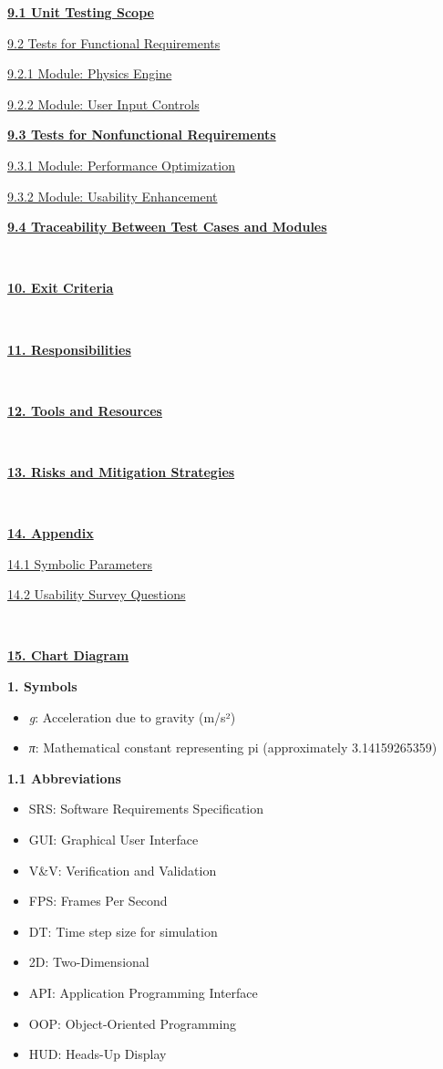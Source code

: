 \documentclass[
]{article}
\begin{document}
\protect\hyperlink{Ayy}{\textbf{9.1 Unit Testing Scope}}

\protect\hyperlink{Ao2}{9.2 Tests for Functional Requirements}

\protect\hyperlink{Ao3}{9.2.1 Module: Physics Engine}

\protect\hyperlink{Ao4}{9.2.2 Module: User Input Controls}

\protect\hyperlink{Ao5}{\textbf{9.3 Tests for Nonfunctional
Requirements}}

\protect\hyperlink{Ao6}{9.3.1 Module: Performance Optimization}

\protect\hyperlink{Ao7}{9.3.2 Module: Usability Enhancement}

\protect\hyperlink{Ao8}{\textbf{9.4 Traceability Between Test Cases and
Modules}}

\

\protect\hyperlink{Akol}{\textbf{10. Exit Criteria}}

\

\protect\hyperlink{Ahhhh}{\textbf{11. Responsibilities}}

\

\protect\hyperlink{Accc}{\textbf{12. Tools and Resources}}

\

\protect\hyperlink{Aggg}{\textbf{13. Risks and Mitigation Strategies}}

\

\textbf{\protect\hyperlink{Al}{14. Appendix}}

\protect\hyperlink{All}{14.1 Symbolic Parameters}

\protect\hyperlink{Allll}{14.2 Usability Survey Questions}

\

\protect\hyperlink{Ajj}{\textbf{15. Chart Diagram}}

\textbf{\hfill\break
}

\newpage
\protect\hypertarget{Adsds}{}{}\textbf{1. Symbols}


\begin{itemize}
\item
  \emph{g}: Acceleration due to gravity (m/s²)
\item
  \emph{π}: Mathematical constant representing pi (approximately
  3.14159265359)
\end{itemize}

\protect\hypertarget{A2}{}{}\textbf{1.1 Abbreviations}

\begin{itemize}
\item
  SRS: Software Requirements Specification
\item
  GUI: Graphical User Interface
\item
  V\&V: Verification and Validation
\item
  FPS: Frames Per Second
\item
  DT: Time step size for simulation
\item
  2D: Two-Dimensional
\item
  API: Application Programming Interface
\item
  OOP: Object-Oriented Programming
\item
  HUD: Heads-Up Display
\end{itemize}
\end{document}
